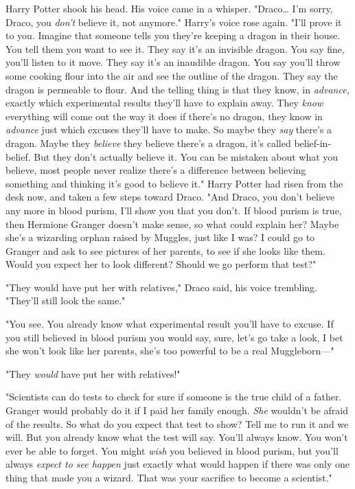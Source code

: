 Harry Potter shook his head. His voice came in a whisper. "Draco{\ldots} I'm 
sorry, Draco, you \emph{don't} believe it, not anymore." Harry's voice rose 
again. "I'll prove it to you. Imagine that someone tells you they're keeping a 
dragon in their house. You tell them you want to see it. They say it's an 
invisible dragon. You say fine, you'll listen to it move. They say it's an 
inaudible dragon. You say you'll throw some cooking flour into the air and see 
the outline of the dragon. They say the dragon is permeable to flour. And the 
telling thing is that they know, in \emph{advance,} exactly which experimental 
results they'll have to explain away. They \emph{know} everything will come out 
the way it does if there's no dragon, they know in \emph{advance} just which 
excuses they'll have to make. So maybe they \emph{say} there's a dragon. Maybe 
they \emph{believe} they believe there's a dragon, it's called 
belief-in-belief. But they don't actually believe it. You can be mistaken about 
what you believe, most people never realize there's a difference between 
believing something and thinking it's good to believe it." Harry Potter had 
risen from the desk now, and taken a few steps toward Draco. "And Draco, you 
don't believe any more in blood purism, I'll show you that you don't. If blood 
purism is true, then Hermione Granger doesn't make sense, so what could explain 
her? Maybe she's a wizarding orphan raised by Muggles, just like I was? I could 
go to Granger and ask to see pictures of her parents, to see if she looks like 
them. Would you expect her to look different? Should we go perform that test?"

"They would have put her with relatives," Draco said, his voice trembling. 
"They'll still look the same."

"You see. You already know what experimental result you'll have to excuse. If 
you still believed in blood purism you would say, sure, let's go take a look, I 
bet she won't look like her parents, she's too powerful to be a real 
Muggleborn---"

"They \emph{would} have put her with relatives!"

"Scientists can do tests to check for sure if someone is the true child of a 
father. Granger would probably do it if I paid her family enough. \emph{She} 
wouldn't be afraid of the results. So what do you expect that test to show? 
Tell me to run it and we will. But you already know what the test will say. 
You'll always know. You won't ever be able to forget. You might \emph{wish} you 
believed in blood purism, but you'll always \emph{expect to see happen} just 
exactly what would happen if there was only one thing that made you a wizard. 
That was your sacrifice to become a scientist."

